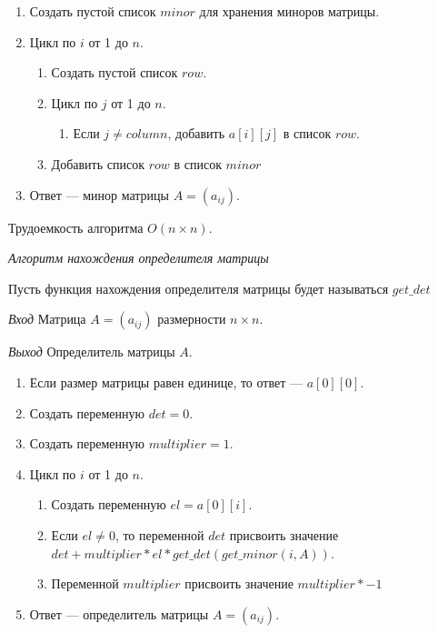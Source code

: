 \documentclass[bachelor, och, labwork]{shiza}
\begin{document}
\begin{enumerate}
    \item Создать пустой список $minor$ для хранения миноров матрицы.
    \item Цикл по $i$ от 1 до $n$.
    \begin{enumerate}
        \item Создать пустой список $row$.
        \item Цикл по $j$ от 1 до $n$.
        \begin{enumerate}
            \item Если $j \not = column$, добавить $a[i][j]$ в список $row$.
        \end{enumerate}
        \item Добавить список $row$ в список $minor$
    \end{enumerate}
    \item Ответ --- минор матрицы $A=(a_{ij})$.
\end{enumerate}

Трудоемкость алгоритма $O(n \times n)$.

\begin{center}
    \textit{Алгоритм нахождения определителя матрицы}
\end{center}

Пусть функция нахождения определителя матрицы будет называться $get\_det$

\textit{Вход} Матрица $A = (a_{ij})$ размерности $n \times n$.

\textit{Выход} Определитель матрицы $A$.

\begin{enumerate}
    \item Если размер матрицы равен единице, то ответ --- $a[0][0]$.
    \item Создать переменную $det=0$.
    \item Создать переменную $multiplier=1$.
    \item Цикл по $i$ от 1 до $n$.
        \begin{enumerate}
            \item Создать переменную $el=a[0][i]$.
            \item Если $el \not = 0$, то переменной $det$ присвоить значение
            $det + multiplier * el * get\_det(get\_minor(i, A))$.
            \item Переменной $multiplier$ присвоить значение $multiplier * -1$
        \end{enumerate}
    \item Ответ --- определитель матрицы $A=(a_{ij})$.
\end{enumerate}
\end{document}
